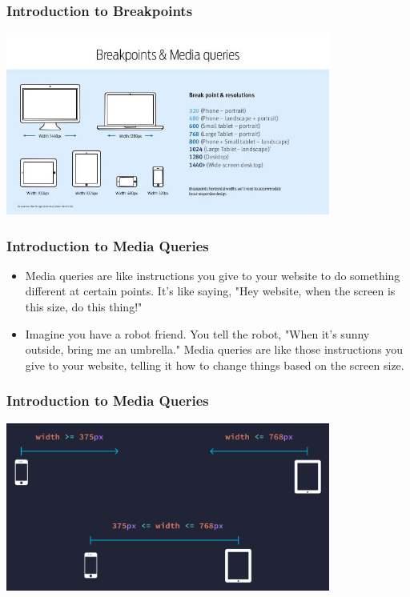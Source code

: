 \documentclass[aspectratio=169, table]{beamer}
\begin{document}
\begin{frame}[fragile]
	\frametitle{Introduction to Breakpoints}
	\vskip1cm
	\begin{center}
		\includegraphics[width=0.8\textwidth]{classFiles/breakpoints.jpg}
	\end{center}
\end{frame}

\begin{frame}[fragile]
	\frametitle{Introduction to Media Queries}
	\vskip1cm
	 \begin{itemize}
        \item Media queries are like instructions you give to your website to do something different at certain points. It's like saying, "Hey website, when the screen is this size, do this thing!"
	\item Imagine you have a robot friend. You tell the robot, "When it's sunny outside, bring me an umbrella." Media queries are like those instructions you give to your website, telling it how to change things based on the screen size.
   	 \end{itemize}
\end{frame}

\begin{frame}[fragile]
	\frametitle{Introduction to Media Queries}
	\vskip0cm
	\begin{center}
		\includegraphics[width=0.8\textwidth]{classFiles/media-queries.png}
	\end{center}
\end{frame}
\end{document}
